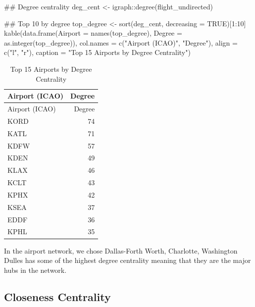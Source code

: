\documentclass[
  letterpaper,
]{report}
\newenvironment{Shaded}{}{}
\newcommand{\AttributeTok}[1]{\textcolor[rgb]{0.84,0.23,0.29}{#1}}
\newcommand{\ConstantTok}[1]{\textcolor[rgb]{0.00,0.36,0.77}{#1}}
\newcommand{\DecValTok}[1]{\textcolor[rgb]{0.00,0.36,0.77}{#1}}
\newcommand{\DocumentationTok}[1]{\textcolor[rgb]{0.42,0.45,0.49}{#1}}
\newcommand{\FunctionTok}[1]{\textcolor[rgb]{0.44,0.26,0.76}{#1}}
\newcommand{\NormalTok}[1]{\textcolor[rgb]{0.14,0.16,0.18}{#1}}
\newcommand{\OtherTok}[1]{\textcolor[rgb]{0.44,0.26,0.76}{#1}}
\newcommand{\SpecialCharTok}[1]{\textcolor[rgb]{0.00,0.36,0.77}{#1}}
\newcommand{\StringTok}[1]{\textcolor[rgb]{0.01,0.18,0.38}{#1}}
\begin{document}
\begin{Shaded}
\begin{Highlighting}[]
\DocumentationTok{\#\# Degree centrality}
\NormalTok{deg\_cent }\OtherTok{\textless{}{-}}\NormalTok{ igraph}\SpecialCharTok{::}\FunctionTok{degree}\NormalTok{(flight\_undirected)}

\DocumentationTok{\#\# Top 10 by degree}
\NormalTok{top\_degree }\OtherTok{\textless{}{-}} \FunctionTok{sort}\NormalTok{(deg\_cent, }\AttributeTok{decreasing =} \ConstantTok{TRUE}\NormalTok{)[}\DecValTok{1}\SpecialCharTok{:}\DecValTok{10}\NormalTok{]}
\FunctionTok{kable}\NormalTok{(}\FunctionTok{data.frame}\NormalTok{(}\AttributeTok{Airport =} \FunctionTok{names}\NormalTok{(top\_degree),}
                 \AttributeTok{Degree =} \FunctionTok{as.integer}\NormalTok{(top\_degree)),}
      \AttributeTok{col.names =} \FunctionTok{c}\NormalTok{(}\StringTok{"Airport (ICAO)"}\NormalTok{, }\StringTok{"Degree"}\NormalTok{),}
      \AttributeTok{align =} \FunctionTok{c}\NormalTok{(}\StringTok{"l"}\NormalTok{, }\StringTok{"r"}\NormalTok{),}
      \AttributeTok{caption =} \StringTok{"Top 15 Airports by Degree Centrality"}\NormalTok{)}
\end{Highlighting}
\end{Shaded}

\begin{longtable}[]{@{}lr@{}}
\caption{Top 15 Airports by Degree Centrality}\tabularnewline
\toprule\noalign{}
Airport (ICAO) & Degree \\
\midrule\noalign{}
\endfirsthead
\toprule\noalign{}
Airport (ICAO) & Degree \\
\midrule\noalign{}
\endhead
\bottomrule\noalign{}
\endlastfoot
KORD & 74 \\
KATL & 71 \\
KDFW & 57 \\
KDEN & 49 \\
KLAX & 46 \\
KCLT & 43 \\
KPHX & 42 \\
KSEA & 37 \\
EDDF & 36 \\
KPHL & 35 \\
\end{longtable}

In the airport network, we chose Dallas-Forth Worth, Charlotte,
Washington Dulles has some of the highest degree centrality meaning that
they are the major hubs in the network.

\subsection{Closeness Centrality}\label{closeness-centrality}
\end{document}

